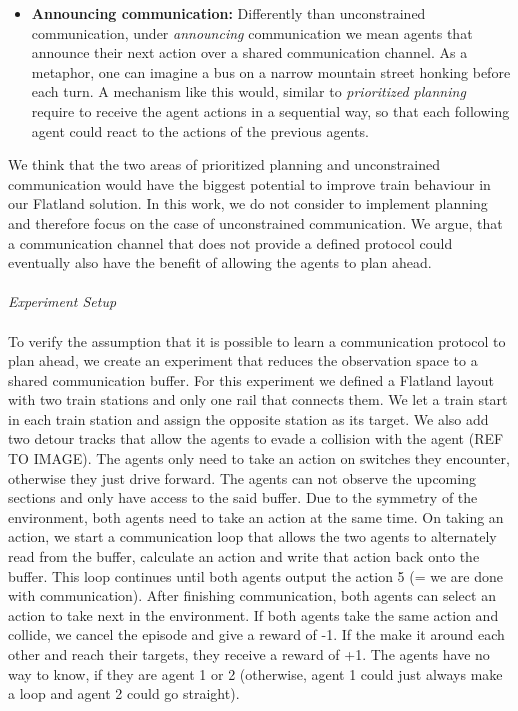 \begin{itemize}
	\item \textbf{Announcing communication:} Differently than unconstrained communication, under \textit{announcing} communication we mean agents that announce their next action over a shared communication channel. As a metaphor, one can imagine a bus on a narrow mountain street honking before each turn. A mechanism like this would, similar to \textit{prioritized planning} require to receive the agent actions in a sequential way, so that each following agent could react to the actions of the previous agents.
\end{itemize}

We think that the two areas of prioritized planning and unconstrained communication would have the biggest potential to improve train behaviour in our Flatland solution. In this work, we do not consider to implement planning and therefore focus on the case of unconstrained communication. We argue, that a communication channel that does not provide a defined protocol could eventually also have the benefit of allowing the agents to plan ahead.\\\\
\textit{Experiment Setup}\\\\
To verify the assumption that it is possible to learn a communication protocol to plan ahead, we create an experiment that reduces the observation space to a shared communication buffer. For this experiment we defined a Flatland layout with two train stations and only one rail that connects them. We let a train start in each train station and assign the opposite station as its target. We also add two detour tracks that allow the agents to evade a collision with the agent (REF TO IMAGE).
The agents only need to take an action on switches they encounter, otherwise they just drive forward. The agents can not observe the upcoming sections and only have access to the said buffer. Due to the symmetry of the environment, both agents need to take an action at the same time. On taking an action, we start a communication loop that allows the two agents to alternately read from the buffer, calculate an action and write that action back onto the buffer. This loop continues until both agents output the action 5 (= we are done with communication). After finishing communication, both agents can select an action to take next in the environment. If both agents take the same action and collide, we cancel the episode and give a reward of -1. If the make it around each other and reach their targets, they receive a reward of +1. The agents have no way to know, if they are agent 1 or 2 (otherwise, agent 1 could just always make a loop and agent 2 could go straight).


